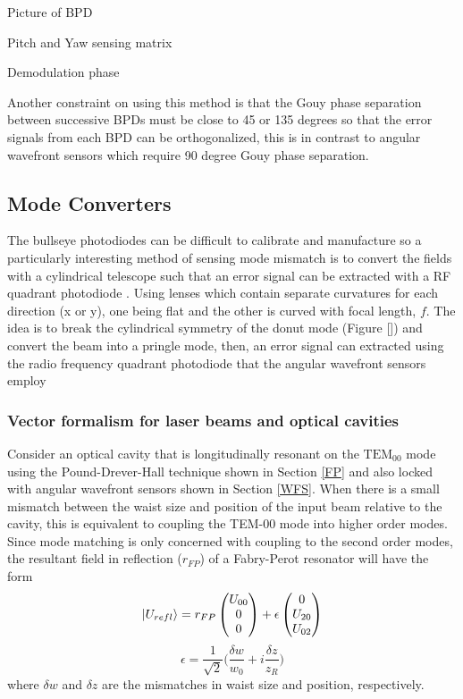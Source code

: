 		Picture of BPD
		
		Pitch and Yaw sensing matrix
		
		Demodulation phase

		
		Another constraint on using this method is that the Gouy phase separation between successive BPDs must be close to 45 or 135 degrees so that the error signals from each BPD can be orthogonalized, this is in contrast to angular wavefront sensors which require 90 degree Gouy phase separation.

		
\subsection{Mode Converters}
The bullseye photodiodes can be difficult to calibrate and manufacture so a particularly interesting method of sensing mode mismatch is to convert the fields with a cylindrical telescope such that an error signal can be extracted with a RF quadrant photodiode .  Using lenses which contain separate curvatures for each direction (x or y), one being flat and the other is curved with focal length, $f$.  The idea is to break the cylindrical symmetry of the donut mode (Figure []) and convert the beam into a pringle mode, then, an error signal can extracted using the radio frequency quadrant photodiode that the angular wavefront sensors employ

\subsubsection{Vector formalism for laser beams and optical cavities}
Consider an optical cavity that is longitudinally resonant on the $\text{TEM}_{00}$ mode using the Pound-Drever-Hall technique shown in Section \ref{FP} and also locked with angular wavefront sensors shown in Section \ref{WFS}. When there is a small mismatch between the waist size and position of the input beam relative to the cavity, this is equivalent to coupling the TEM-00 mode into higher order modes.  Since mode matching is only concerned with coupling to the second order modes, the  resultant field in reflection ($r_{FP}$) of a Fabry-Perot resonator will have the form
	\begin{equation}\label{MMVector}
\ket{U_{refl}} = r_{FP} \begin{pmatrix} U_{00}
\\ 0
\\ 0
\end{pmatrix}
+
\epsilon \begin{pmatrix} 0
\\ U_{20}
\\ U_{02}
\end{pmatrix}
\end{equation}
\begin{equation}
\epsilon = \frac{1}{\sqrt{2}} \bigg(\frac{\delta w}{w_0} + i \frac{\delta z}{z_R}\bigg)
\end{equation}
where $\delta w$ and $\delta z$ are the mismatches in waist size and position, respectively.  

